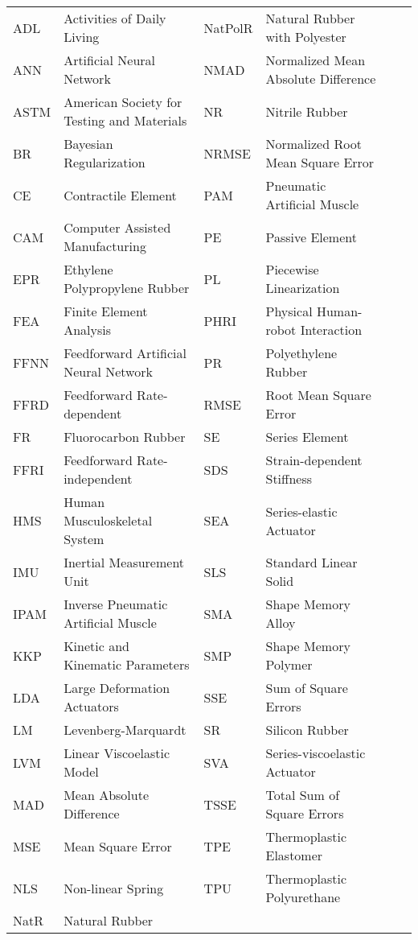 \begin{abbreviations}


\begin{table}[h]
\centering
\footnotesize{
\begin{tabular}{lp{5cm}lp{5cm}ll}
ADL     & Activities of Daily Living &      NatPolR & Natural Rubber with Polyester \\
ANN     & Artificial Neural Network &      NMAD    & Normalized Mean Absolute Difference  \\
ASTM    & American Society for Testing and Materials &      NR      & Nitrile Rubber  \\
BR      & Bayesian Regularization &       NRMSE   & Normalized Root Mean Square Error  \\
CE      & Contractile Element &     PAM     & Pneumatic Artificial Muscle  \\
CAM     & Computer Assisted Manufacturing &      PE      & Passive Element  \\      
EPR     & Ethylene Polypropylene Rubber &      PL      & Piecewise Linearization  \\
FEA     & Finite Element Analysis & PHRI    & Physical Human-robot Interaction \\      
FFNN    & Feedforward Artificial Neural Network & PR      & Polyethylene Rubber  \\
FFRD    & Feedforward Rate-dependent & RMSE    & Root Mean Square Error  \\       
FR      & Fluorocarbon Rubber & SE      & Series Element \\     
FFRI    & Feedforward Rate-independent & SDS     & Strain-dependent Stiffness \\     
HMS     & Human Musculoskeletal System &     SEA     & Series-elastic Actuator \\    
IMU     & Inertial Measurement Unit &      SLS     & Standard Linear Solid \\
IPAM    & Inverse Pneumatic Artificial Muscle &      SMA     & Shape Memory Alloy  \\
KKP     & Kinetic and Kinematic Parameters &      SMP     & Shape Memory Polymer\\  
LDA     & Large Deformation Actuators &      SSE     & Sum of Square Errors  \\      
LM      & Levenberg-Marquardt &      SR      & Silicon Rubber  \\     
LVM     & Linear Viscoelastic Model &      SVA     & Series-viscoelastic Actuator  \\
MAD     & Mean Absolute Difference & TSSE    & Total Sum of Square Errors \\
MSE     & Mean Square Error & TPE     & Thermoplastic Elastomer  \\
NLS     & Non-linear Spring & TPU     & Thermoplastic Polyurethane  \\
NatR    & Natural Rubber \\



\end{tabular}}
\end{table}
\end{abbreviations}
